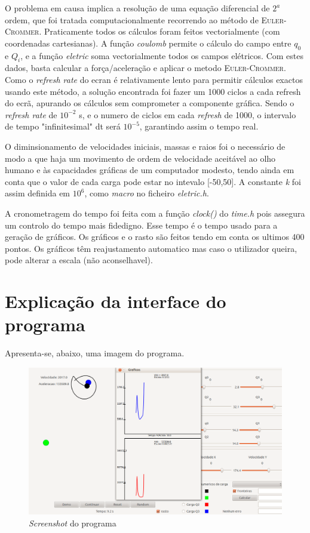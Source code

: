 \documentclass[a4paper,11pt]{article}
\begin{document}
O problema em causa implica a resolução de uma equação diferencial de $2^{a}$ ordem, que foi tratada computacionalmente recorrendo ao método de \textsc{Euler-Crommer}. Praticamente todos os cálculos foram feitos vectorialmente (com coordenadas cartesianas). A função \emph{coulomb} permite o cálculo do campo entre $q_{0}$ e $Q_{i}$, e a função \emph{eletric} soma vectorialmente todos os campos elétricos. Com estes dados, basta calcular a força/aceleração e aplicar o metodo \textsc{Euler-Crommer}. Como o \emph{refresh rate} do ecran é relativamente lento para permitir cálculos exactos usando este método, a solução encontrada foi fazer um 1000 ciclos a cada refresh do ecrã, apurando os cálculos sem comprometer a componente gráfica. Sendo o \emph{refresh rate} de $10^{-2}$ s, e o numero de ciclos em cada \emph{refresh} de 1000, o intervalo de tempo "infinitesimal" dt será $10^{-5}$, garantindo assim o tempo real.


O diminsionamento de velocidades iniciais, massas e raios foi o necessário de modo a que haja um movimento de ordem de velocidade aceitável ao olho humano e às capacidades gráficas de um computador modesto, tendo ainda em conta que o valor de cada carga pode estar no intevalo [-50,50]. A constante \emph{k} foi assim definida em $10^{6}$, como \emph{macro} no ficheiro \emph{eletric.h}.


A cronometragem do tempo foi feita com a função \emph{clock()} do \emph{time.h} pois assegura um controlo do tempo mais fidedigno. Esse tempo é o tempo usado para a geração de gráficos. Os gráficos e o rasto são feitos tendo em conta os ultimos 400 pontos. Os gráficos têm reajustamento automatico mas caso o utilizador queira, pode alterar a escala (não aconselhavel).
\section{Explicação da interface do programa}
Apresenta-se, abaixo, uma imagem do programa.
\begin{figure}[h!]
\centering
\includegraphics[scale=0.25]{screenshot.png}
\caption{\emph{Screenshot} do programa}
\end{figure}
\end{document}

